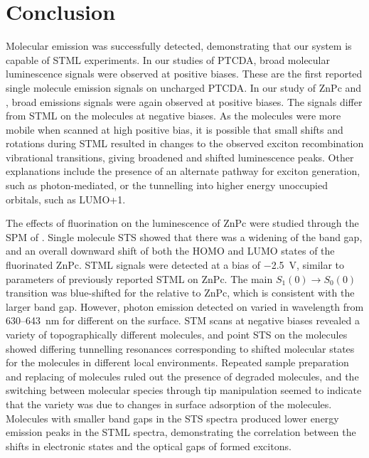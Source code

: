 
\chapter{Conclusion}
\label{ch:conc}


Molecular emission was successfully detected, demonstrating that our system is capable of \ac{STML} experiments. In our studies of PTCDA, broad molecular luminescence signals were observed at positive biases. These are the first reported single molecule emission signals on uncharged \ac{PTCDA}. In our study of \ac{ZnPc} and , broad emissions signals were again observed at positive biases. The signals differ from \ac{STML} on the molecules at negative biases. As the molecules were more mobile when scanned at high positive bias, it is possible that small shifts and rotations during \ac{STML} resulted in changes to the observed exciton recombination vibrational transitions, giving broadened and shifted luminescence peaks. Other explanations include the presence of an alternate pathway for exciton generation, such as photon-mediated, or the tunnelling into higher energy unoccupied orbitals, such as LUMO+1. 

The effects of fluorination on the luminescence of ZnPc were studied through the \ac{SPM} of . Single molecule \ac{STS} showed that there was a widening of the band gap, and an overall downward shift of both the HOMO and LUMO states of the fluorinated ZnPc. \ac{STML} signals were detected at a bias of \SI{-2.5}{V}, similar to parameters of previously reported \ac{STML} on ZnPc. The main $S_1(0) \rightarrow S_0(0)$ transition was blue-shifted for the  relative to ZnPc, which is consistent with the larger band gap. However, photon emission detected on  varied in wavelength from 630--\SI{643}{nm} for different  on the surface. \ac{STM} scans at negative biases revealed a variety of topographically different molecules, and point \ac{STS} on the molecules showed differing tunnelling resonances corresponding to shifted molecular states for the molecules in different local environments. Repeated sample preparation and replacing of molecules ruled out the presence of degraded molecules, and the switching between molecular species through tip manipulation seemed to indicate that the variety was due to changes in surface adsorption of the molecules. Molecules with smaller band gaps in the \ac{STS} spectra produced lower energy emission peaks in the \ac{STML} spectra, demonstrating the correlation between the shifts in electronic states and the optical gaps of formed excitons.

